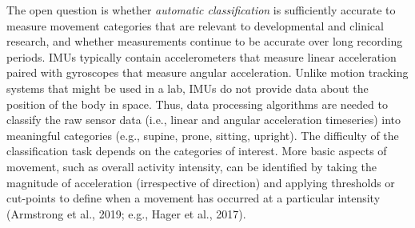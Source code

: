 \documentclass[
  man]{apa6}
\begin{document}
The open question is whether \emph{automatic classification} is sufficiently accurate to measure movement categories that are relevant to developmental and clinical research, and whether measurements continue to be accurate over long recording periods. IMUs typically contain accelerometers that measure linear acceleration paired with gyroscopes that measure angular acceleration. Unlike motion tracking systems that might be used in a lab, IMUs do not provide data about the position of the body in space. Thus, data processing algorithms are needed to classify the raw sensor data (i.e., linear and angular acceleration timeseries) into meaningful categories (e.g., supine, prone, sitting, upright). The difficulty of the classification task depends on the categories of interest. More basic aspects of movement, such as overall activity intensity, can be identified by taking the magnitude of acceleration (irrespective of direction) and applying thresholds or cut-points to define when a movement has occurred at a particular intensity (Armstrong et al., 2019; e.g., Hager et al., 2017).
\end{document}

